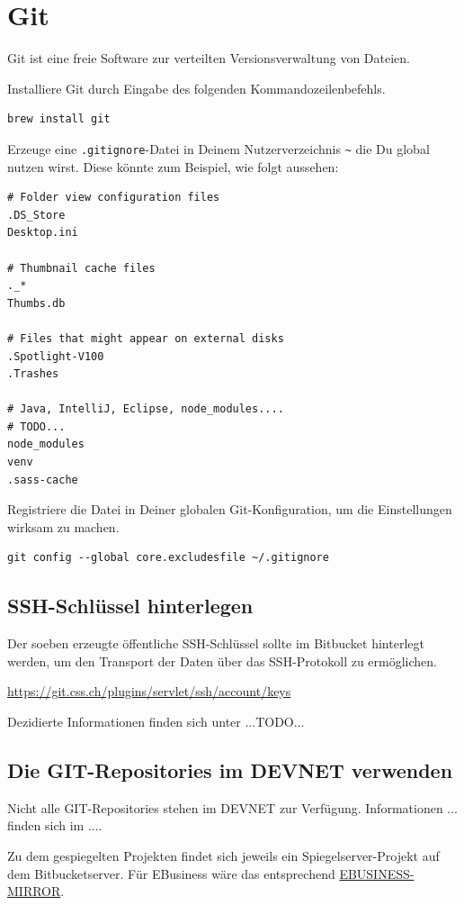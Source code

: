 \documentclass[]{article}
\newcommand{\code}[1]{\texttt{#1}}
\begin{document}
\section{Git}
Git ist eine freie Software zur verteilten Versionsverwaltung von Dateien.

Installiere Git durch Eingabe des folgenden Kommandozeilenbefehls.
\begin{verbatim}
brew install git
\end{verbatim}

Erzeuge eine \code{.gitignore}-Datei in Deinem Nutzerverzeichnis \code{\~} die Du global nutzen wirst. Diese könnte zum Beispiel, wie folgt aussehen:
\begin{verbatim}
# Folder view configuration files
.DS_Store
Desktop.ini

# Thumbnail cache files
._*
Thumbs.db

# Files that might appear on external disks
.Spotlight-V100
.Trashes

# Java, IntelliJ, Eclipse, node_modules....
# TODO...
node_modules
venv
.sass-cache
\end{verbatim}

Registriere die Datei in Deiner globalen Git-Konfiguration, um die Einstellungen wirksam zu machen.
\begin{verbatim}
git config --global core.excludesfile ~/.gitignore
\end{verbatim}

\subsection{SSH-Schlüssel hinterlegen}
Der soeben erzeugte öffentliche SSH-Schlüssel sollte im Bitbucket hinterlegt werden, um den Transport der Daten über das SSH-Protokoll zu ermöglichen.

\href{https://git.css.ch/plugins/servlet/ssh/account/keys}{https://git.css.ch/plugins/servlet/ssh/account/keys}

Dezidierte Informationen finden sich unter ...TODO...

\subsection{Die GIT-Repositories im DEVNET verwenden}
Nicht alle GIT-Repositories stehen im DEVNET zur Verfügung. Informationen ... finden sich im ....

Zu dem gespiegelten Projekten findet sich jeweils ein Spiegelserver-Projekt auf dem Bitbucketserver. 
Für EBusiness wäre das entsprechend \href{https://git.css.ch/projects/EBUSINESS-MIRROR}{EBUSINESS-MIRROR}.
\end{document}
